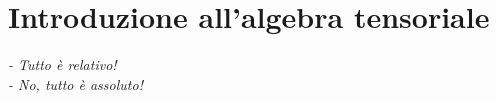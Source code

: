 \chapter{Introduzione all'algebra tensoriale}\label{sec:algebra}
\vspace{-1.0cm}
\begin{flushright}
\textit{
- Tutto è relativo! \\
- No, tutto è assoluto!
}
\end{flushright}
\vspace{+1.0cm}
\minitoc
\newpage



% 
% 
% 
% 
% 
% 
% 
% 
% 
% 
% 
% 




